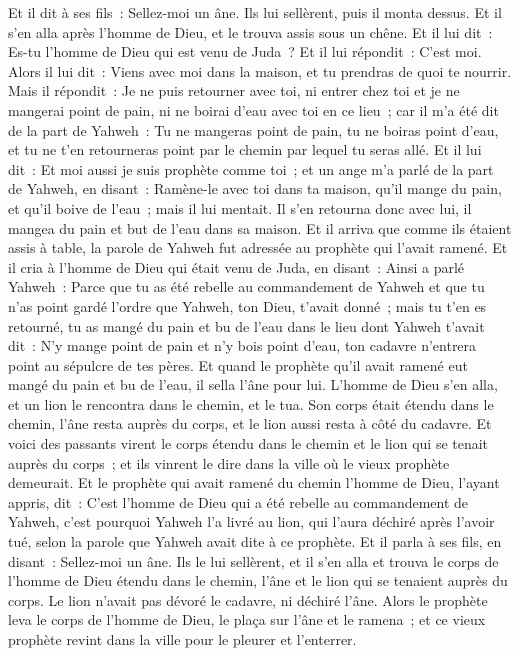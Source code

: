 \begin{multicols}{2}
Et il dit à ses fils~: Sellez-moi un âne. Ils lui sellèrent, puis il monta dessus.
Et il s'en alla après l'homme de Dieu, et le trouva assis sous un chêne. Et il lui dit~: Es-tu l'homme de Dieu qui est venu de Juda~? Et il lui répondit~: C'est moi.
Alors il lui dit~: Viens avec moi dans la maison, et tu prendras de quoi te nourrir.
Mais il répondit~: Je ne puis retourner avec toi, ni entrer chez toi et je ne mangerai point de pain, ni ne boirai d'eau avec toi en ce lieu~;
car il m'a été dit de la part de Yahweh~: Tu ne mangeras point de pain, tu ne boiras point d'eau, et tu ne t'en retourneras point par le chemin par lequel tu seras allé.
Et il lui dit~: Et moi aussi je suis prophète comme toi~; et un ange m'a parlé de la part de Yahweh, en disant~: Ramène-le avec toi dans ta maison, qu'il mange du pain, et qu'il boive de l'eau~; mais il lui mentait.
Il s'en retourna donc avec lui, il mangea du pain et but de l'eau dans sa maison.
Et il arriva que comme ils étaient assis à table, la parole de Yahweh fut adressée au prophète qui l'avait ramené.
Et il cria à l'homme de Dieu qui était venu de Juda, en disant~: Ainsi a parlé Yahweh~: Parce que tu as été rebelle au commandement de Yahweh et que tu n'as point gardé l'ordre que Yahweh, ton Dieu, t'avait donné~;
mais tu t'en es retourné, tu as mangé du pain et bu de l'eau dans le lieu dont Yahweh t'avait dit~: N'y mange point de pain et n'y bois point d'eau, ton cadavre n'entrera point au sépulcre de tes pères.
Et quand le prophète qu'il avait ramené eut mangé du pain et bu de l'eau, il sella l'âne pour lui.
L'homme de Dieu s'en alla, et un lion le rencontra dans le chemin, et le tua. Son corps était étendu dans le chemin, l'âne resta auprès du corps, et le lion aussi resta à côté du cadavre.
Et voici des passants virent le corps étendu dans le chemin et le lion qui se tenait auprès du corps~; et ils vinrent le dire dans la ville où le vieux prophète demeurait.
Et le prophète qui avait ramené du chemin l'homme de Dieu, l'ayant appris, dit~: C'est l'homme de Dieu qui a été rebelle au commandement de Yahweh, c'est pourquoi Yahweh l'a livré au lion, qui l'aura déchiré après l'avoir tué, selon la parole que Yahweh avait dite à ce prophète.
Et il parla à ses fils, en disant~: Sellez-moi un âne. Ils le lui sellèrent,
et il s'en alla et trouva le corps de l'homme de Dieu étendu dans le chemin, l'âne et le lion qui se tenaient auprès du corps. Le lion n'avait pas dévoré le cadavre, ni déchiré l'âne.
Alors le prophète leva le corps de l'homme de Dieu, le plaça sur l'âne et le ramena~; et ce vieux prophète revint dans la ville pour le pleurer et l'enterrer.

\end{multicols}
